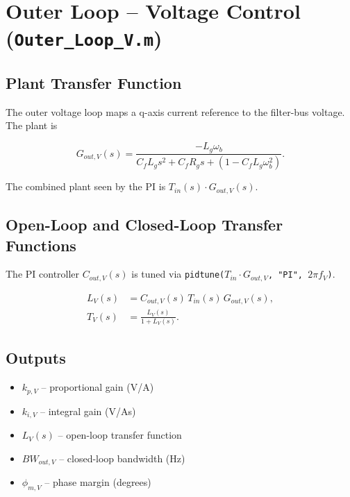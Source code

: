 \documentclass[12pt, a4paper]{article}
\begin{document}
\section{Outer Loop -- Voltage Control (\texttt{Outer\_Loop\_V.m})}

\subsection{Plant Transfer Function}

The outer voltage loop maps a q-axis current reference to the filter-bus voltage.
The plant is

\begin{equation}
    G_{out,V}(s)
    = \frac{-L_g \omega_b}
           {C_f L_g s^{2}
            + C_f R_g s
            + \!\left(1 - C_f L_g \omega_b^{2}\right)}.
\end{equation}

The combined plant seen by the PI is $T_{in}(s)\cdot G_{out,V}(s)$.

\subsection{Open-Loop and Closed-Loop Transfer Functions}

The PI controller $C_{out,V}(s)$ is tuned via
\texttt{pidtune($T_{in}\cdot G_{out,V}$, "PI", $2\pi f_{V}$)}.

\begin{align}
    L_{V}(s) &= C_{out,V}(s)\,T_{in}(s)\,G_{out,V}(s),  \\[4pt]
    T_{V}(s) &= \frac{L_{V}(s)}{1 + L_{V}(s)}.
\end{align}

\subsection{Outputs}
\begin{itemize}
    \item $k_{p,V}$ -- proportional gain (V/A)
    \item $k_{i,V}$ -- integral gain (V/As)
    \item $L_V(s)$ -- open-loop transfer function
    \item $BW_{out,V}$ -- closed-loop bandwidth (Hz)
    \item $\phi_{m,V}$ -- phase margin (degrees)
\end{itemize}
\end{document}
